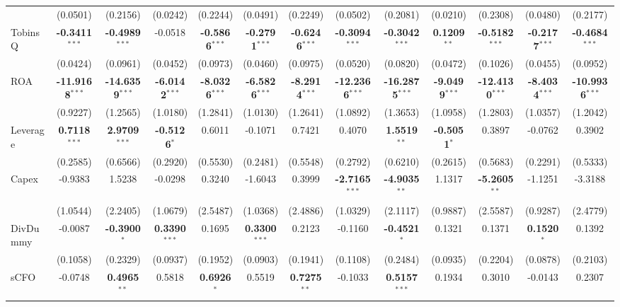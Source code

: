 \begin{landscape}
\begin{table}[H]
\begin{tabular}{lcccccccccccc}
 & (0.0501) & (0.2156) & (0.0242) & (0.2244) & (0.0491) & (0.2249) & (0.0502) & (0.2081) & (0.0210) & (0.2308) & (0.0480) & (0.2177) \\
TobinsQ & \textbf{-0.3411}$^{***}$ & \textbf{-0.4989}$^{***}$ & -0.0518 & \textbf{-0.5866}$^{***}$ & \textbf{-0.2791}$^{***}$ & \textbf{-0.6246}$^{***}$ & \textbf{-0.3094}$^{***}$ & \textbf{-0.3042}$^{***}$ & \textbf{0.1209}$^{**}$ & \textbf{-0.5182}$^{***}$ & \textbf{-0.2177}$^{***}$ & \textbf{-0.4684}$^{***}$ \\
 & (0.0424) & (0.0961) & (0.0452) & (0.0973) & (0.0460) & (0.0975) & (0.0520) & (0.0820) & (0.0472) & (0.1026) & (0.0455) & (0.0952) \\
ROA & \textbf{-11.9168}$^{***}$ & \textbf{-14.6359}$^{***}$ & \textbf{-6.0142}$^{***}$ & \textbf{-8.0326}$^{***}$ & \textbf{-6.5826}$^{***}$ & \textbf{-8.2914}$^{***}$ & \textbf{-12.2366}$^{***}$ & \textbf{-16.2875}$^{***}$ & \textbf{-9.0499}$^{***}$ & \textbf{-12.4130}$^{***}$ & \textbf{-8.4034}$^{***}$ & \textbf{-10.9936}$^{***}$ \\
 & (0.9227) & (1.2565) & (1.0180) & (1.2841) & (1.0130) & (1.2641) & (1.0892) & (1.3653) & (1.0958) & (1.2803) & (1.0357) & (1.2042) \\
Leverage & \textbf{0.7118}$^{***}$ & \textbf{2.9709}$^{***}$ & \textbf{-0.5126}$^{*}$ & 0.6011 & -0.1071 & 0.7421 & 0.4070 & \textbf{1.5519}$^{**}$ & \textbf{-0.5051}$^{*}$ & 0.3897 & -0.0762 & 0.3902 \\
 & (0.2585) & (0.6566) & (0.2920) & (0.5530) & (0.2481) & (0.5548) & (0.2792) & (0.6210) & (0.2615) & (0.5683) & (0.2291) & (0.5333) \\
Capex & -0.9383 & 1.5238 & -0.0298 & 0.3240 & -1.6043 & 0.3999 & \textbf{-2.7165}$^{***}$ & \textbf{-4.9035}$^{**}$ & 1.1317 & \textbf{-5.2605}$^{**}$ & -1.1251 & -3.3188 \\
 & (1.0544) & (2.2405) & (1.0679) & (2.5487) & (1.0368) & (2.4886) & (1.0329) & (2.1117) & (0.9887) & (2.5587) & (0.9287) & (2.4779) \\
DivDummy & -0.0087 & \textbf{-0.3900}$^{*}$ & \textbf{0.3390}$^{***}$ & 0.1695 & \textbf{0.3300}$^{***}$ & 0.2123 & -0.1160 & \textbf{-0.4521}$^{*}$ & 0.1321 & 0.1371 & \textbf{0.1520}$^{*}$ & 0.1392 \\
 & (0.1058) & (0.2329) & (0.0937) & (0.1952) & (0.0903) & (0.1941) & (0.1108) & (0.2484) & (0.0935) & (0.2204) & (0.0878) & (0.2103) \\
sCFO & -0.0748 & \textbf{0.4965}$^{**}$ & 0.5818 & \textbf{0.6926}$^{*}$ & 0.5519 & \textbf{0.7275}$^{**}$ & -0.1033 & \textbf{0.5157}$^{***}$ & 0.1934 & 0.3010 & -0.0143 & 0.2307 \\

\end{tabular}
\end{table}
\end{landscape}
